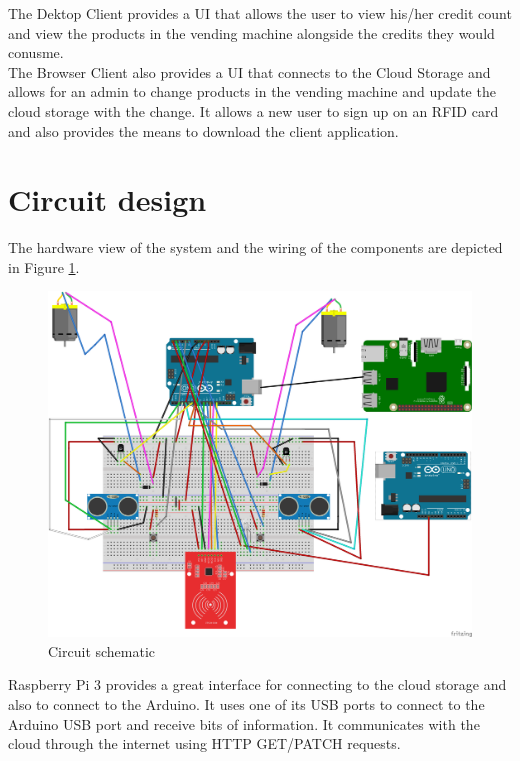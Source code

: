 \documentclass[a4paper,11pt]{article}
\begin{document}
The Dektop Client provides a UI that allows the user to view his/her credit count and view the products in the vending machine alongside the credits they would conusme.\\

The Browser Client also provides a UI that connects to the Cloud Storage and allows for an admin to change products in the vending machine and update the cloud storage with the change. It allows a new user to sign up on an RFID card and also provides the means to download the client application.

\section{Circuit design}

The hardware view of the system and the wiring of the components are depicted in Figure \ref{fig:circuit-design}.

\begin{figure}[h]
\centering
\includegraphics[scale=0.1]{CircuitDesign.png}
\caption{Circuit schematic}
\label{fig:circuit-design}
\end{figure}

Raspberry Pi 3 provides a great interface for connecting to the cloud storage and also to connect to the Arduino. It uses one of its USB ports to connect to the Arduino USB port and receive bits of information. It communicates with the cloud through the internet using HTTP GET/PATCH requests. \\
\end{document}
